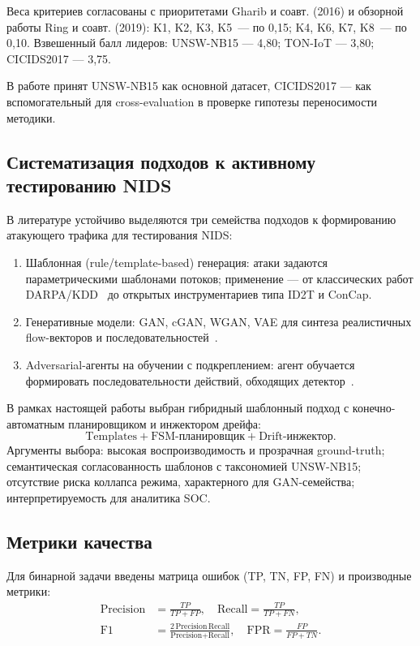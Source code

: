 Веса критериев согласованы с приоритетами Gharib и соавт. (2016)
и обзорной работы Ring и соавт. (2019): K1, K2, K3, K5~--- по
0,15; K4, K6, K7, K8~--- по 0,10. Взвешенный балл лидеров:
UNSW-NB15 --- 4,80; TON-IoT --- 3,80; CICIDS2017 --- 3,75.

В работе принят UNSW-NB15 как основной датасет, CICIDS2017 ---
как вспомогательный для cross-evaluation в проверке гипотезы
переносимости методики.

\subsection{Систематизация подходов к активному тестированию NIDS}

В литературе устойчиво выделяются три семейства подходов к
формированию атакующего трафика для тестирования NIDS:

\begin{enumerate}
    \item Шаблонная (rule/template-based) генерация: атаки задаются
    параметрическими шаблонами потоков; применение --- от классических
    работ DARPA/KDD~\cite{lippmann2000darpa,
    gharib2016evalframework} до открытых инструментариев типа ID2T
    и ConCap.
    \item Генеративные модели: GAN, cGAN, WGAN, VAE для синтеза
    реалистичных flow-векторов и последовательностей~\cite{
    ring2019flowgan, lopez2017cvae, goodfellow2014gan,
    mirza2014cgan, arjovsky2017wgan, gulrajani2017wgangp}.
    \item Adversarial-агенты на обучении с подкреплением: агент
    обучается формировать последовательности действий, обходящих
    детектор~\cite{apruzzese2020adversarial}.
\end{enumerate}

В рамках настоящей работы выбран гибридный шаблонный подход с
конечно-автоматным планировщиком и инжектором дрейфа:
\[
\text{Templates} + \text{FSM-планировщик} + \text{Drift-инжектор}.
\]
Аргументы выбора: высокая воспроизводимость и прозрачная
ground-truth; семантическая согласованность шаблонов с таксономией
UNSW-NB15; отсутствие риска коллапса режима, характерного для
GAN-семейства; интерпретируемость для аналитика SOC.

\subsection{Метрики качества}

Для бинарной задачи введены матрица ошибок (TP, TN, FP, FN) и
производные метрики:
\begin{align}
\text{Precision} &= \frac{TP}{TP + FP},
\quad
\text{Recall} = \frac{TP}{TP + FN},
\label{eq:pr}\\
\text{F1} &= \frac{2\,\text{Precision}\,\text{Recall}}
                 {\text{Precision} + \text{Recall}},
\quad
\text{FPR} = \frac{FP}{FP + TN}.\label{eq:f1}
\end{align}

